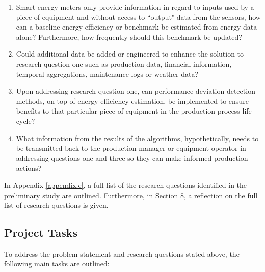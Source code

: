 \begin{enumerate}

    \item Smart energy meters only provide information in regard to inputs used by a piece of equipment and without access to ``output" data from the sensors, how can a baseline energy efficiency or benchmark be estimated from energy data alone? Furthermore, how frequently should this benchmark be updated?
    
    \item Could additional data be added or engineered to enhance the solution to research question one such as production data, financial information, temporal aggregations, maintenance logs or weather data?
    
    \item Upon addressing research question one, can performance deviation detection methods, on top of energy efficiency estimation, be implemented to ensure benefits to that particular piece of equipment in the production process life cycle?
    
    \item What information from the results of the algorithms, hypothetically, needs to be transmitted back to the production manager or equipment operator in addressing questions one and three so they can make informed production actions?
    
\end{enumerate}

In Appendix \ref{appendix:c}, a full list of the research questions identified in the preliminary study are outlined. Furthermore, in \hyperlink{section.8}{Section 8}, a reflection on the full list of research questions is given.

\subsection{Project Tasks}

To address the problem statement and research questions stated above, the following main tasks are outlined:

